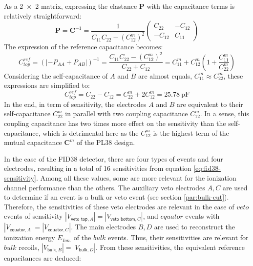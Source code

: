 As a \num{2 x 2} matrix, expressing the elastance $\bm{P}$ with the capacitance terms is relatively straightforward:
\begin{equation}
\bm{P} = \bm{C}^{-1} = 
\frac{1}{C_{11} C_{22} - (C_{12}^m)^2}
 \begin{pmatrix}
C_{22} & -C_{12} \\ 
-C_{12} & C_{11}
\end{pmatrix}
\end{equation}
The expression of the reference capacitance becomes:
\begin{equation}
C_{top}^{ref} = \left( | -P_{AA} + P_{AB} |\right)^{-1}
=  \frac{C_{11} C_{22} - (C_{12}^m)^2}{C_{22} + C_{12}}
= C_{11}^m + C_{12}^m \left( 1 + \frac{C_{11}^m}{C_{22}^m} \right)
\end{equation}
Considering the self-capacitance of $A$ and $B$ are almost equals, $C_{11}^m \approx C_{22}^m$, these expressions are simplified to:
\begin{equation}
\label{eq:pl38-ref-capa-expr}
C_{top}^{ref} = C_{22} - C_{12} = C_{22}^m + 2 C_{12}^m = \SI{25.78}{\pico\farad}
\end{equation}
In the end, in term of sensitivity, the electrodes $A$ and $B$ are equivalent to their self-capacitance $C_{22}^m$ in parallel with two coupling capacitance $C_{12}^m$. In a sense, this coupling capacitance has two times more effect on the sensitivity than the self-capacitance, which is detrimental here as the $C_{12}^m$ is the highest term of the mutual capacitance $\bm{C}^m$ of the PL38 design.

In the case of the FID38 detector, there are four types of events and four electrodes, resulting in a total of 16 sensitivities from equation \ref{eq:fid38-sensitivity}. Among all these values, some are more relevant for the ionization channel performance than the others. The auxiliary veto electrodes $A,C$ are used to determine if an event is a bulk or veto event (see section \ref{par:bulk-cut}). Therefore, the sensitivities of these veto electrodes are relevant in the case of $veto$ events of sensitivity $|V_{\textsf{veto top}, A}|=|V_{\textsf{veto bottom}, C}|$, and $equator$ events with $|V_{\textsf{equator}, A}|=|V_{\textsf{equator}, C}|$. The main electrodes $B,D$ are used to reconstruct the ionization energy $E_{Ion.}$ of the $bulk$ events. Thus, their sensitivities are relevant for $bulk$ recoils, $|V_{\textsf{bulk}, B}|=|V_{\textsf{bulk}, D}|$. From these sensitivities, the equivalent reference capacitances are deduced:

